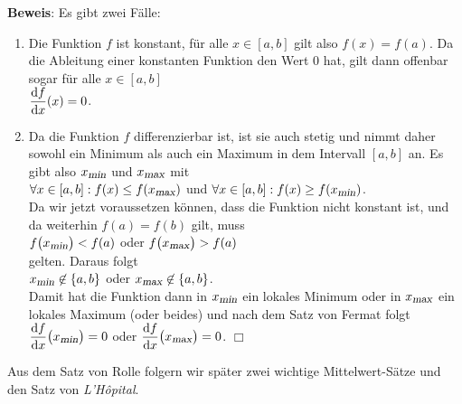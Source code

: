 \noindent
\textbf{Beweis}: Es gibt zwei
F\"alle:
\begin{enumerate}
\item Die Funktion $f$ ist konstant, f\"ur alle $x\in[a,b]$ gilt also $f(x) = f(a)$.
      Da die Ableitung einer konstanten Funktion den Wert $0$ hat, gilt dann offenbar sogar f\"ur alle $x\in[a,b]$ 
      \\[0.3cm]
      \hspace*{1.3cm} $\displaystyle\frac{\textrm{d}f}{\textrm{d}x}(x) = 0$.
\item Da die Funktion $f$ differenzierbar ist, ist sie auch stetig und nimmt
      daher sowohl ein Minimum als auch ein Maximum in dem Intervall $[a,b]$ an.  
      Es gibt also  $x_{\textsl{\footnotesize min}}$ und  $x_{\textsl{\footnotesize max}}$
      mit
      \\[0.2cm]
      \hspace*{1.3cm}
      $\forall x \in [a,b]: f(x) \leq f(x_{\textsl{\footnotesize max}})$ \quad und \quad $\forall x \in [a,b]: f(x) \geq f(x_{\textsl{\footnotesize min}})$.
      \\[0.2cm]
      Da wir jetzt voraussetzen k\"onnen, dass die Funktion nicht konstant ist, und da
      weiterhin $f(a) = f(b)$ gilt, muss 
      \\[0.2cm]
      \hspace*{1.3cm}
      $f\bigl(x_{\textsl{\footnotesize min}}\bigr) < f(a)$ \quad  oder \quad
      $f\bigl(x_{\textsl{\footnotesize max}}\bigr) > f(a)$
      \\[0.2cm]
      gelten.  Daraus folgt 
      \\[0.2cm]
      \hspace*{1.3cm}
      $x_{\textsl{\footnotesize min}}\not\in \{a,b\}$ \quad  oder \quad $x_{\textsl{\footnotesize max}}\not\in \{a,b\}$.
      \\[0.2cm]
      Damit hat die Funktion dann in $x_{\textsl{\footnotesize min}}$ ein
      lokales Minimum oder in $x_{\textsl{\footnotesize max}}$ ein lokales
      Maximum (oder beides) und nach dem Satz von Fermat folgt 
      \\[0.3cm]
      \hspace*{1.3cm}
      $\displaystyle\frac{\textrm{d}f}{\textrm{d}x}\bigl(x_{\textsl{\footnotesize min}}\bigr) = 0$ \quad  oder \quad $\displaystyle\frac{\textrm{d}f}{\textrm{d}x}\bigl(x_{\textsl{\footnotesize max}}\bigr) = 0$.
      \hspace*{\fill} $\Box$
\end{enumerate}
Aus dem Satz von Rolle folgern wir sp\"ater zwei wichtige Mittelwert-S\"atze und den Satz von 
\textsl{L'H\^opital}.
\pagebreak

